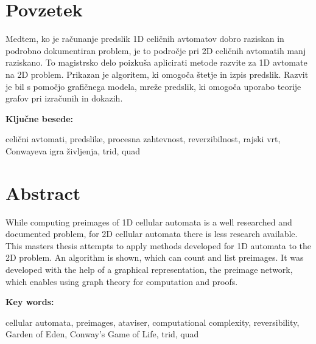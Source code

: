 \documentclass[12pt,a4paper,openany,twoside]{book}
\begin{document}

\clearpage{\pagestyle{empty}\cleardoublepage}


\setcounter{page}{1}

\chapter*{Povzetek}


Medtem, ko je računanje predslik 1D celičnih avtomatov dobro raziskan in
podrobno dokumentiran problem, je to področje pri 2D celičnih avtomatih manj
raziskano. To magistrsko delo poizkuša aplicirati metode razvite za 1D avtomate
na 2D problem. Prikazan je algoritem, ki omogoča štetje in izpis predslik.
Razvit je bil s pomočjo grafičnega modela, mreže predslik, 
ki omogoča uporabo teorije grafov pri izračunih in dokazih.

\vspace{1.3cm}
\noindent
{\large \bf Ključne besede:}

\vspace{0.5cm}
\noindent
celični avtomati, predslike, procesna zahtevnost, reverzibilnost, rajski vrt, Conwayeva igra življenja, trid, quad


\chapter*{Abstract}


While computing preimages of 1D cellular automata is a well researched and
documented problem, for 2D cellular automata there is less research available.
This masters thesis attempts to apply methods developed for 1D automata to the
2D problem. An algorithm is shown, which can count and list preimages.
It was developed with the help of a graphical representation, the preimage network,
which enables using graph theory for computation and proofs.

\vspace{1.3cm}
\noindent
{\large \bf Key words:}

\vspace{0.5cm}
\noindent
cellular automata, preimages, ataviser, computational complexity, reversibility, Garden of Eden, Conway's Game of Life, trid, quad
\end{document}
